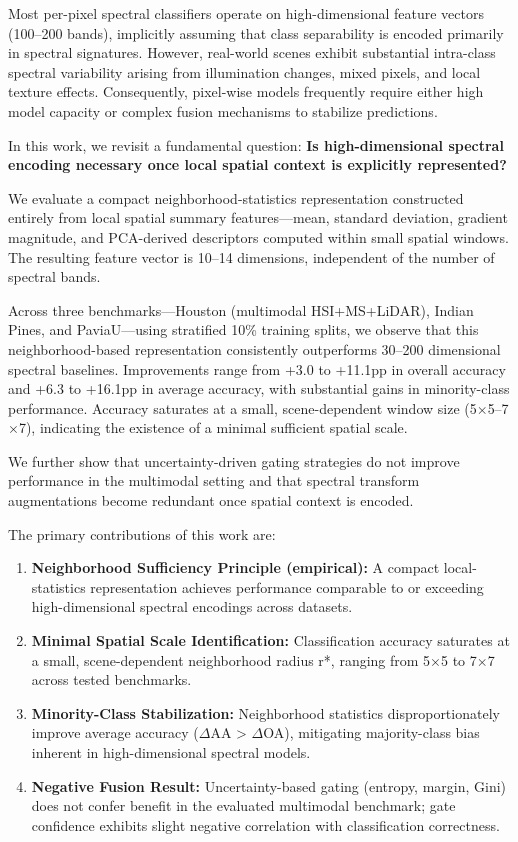 \documentclass[
  journal]{IEEEtran}
\providecommand{\tightlist}{%
  \setlength{\itemsep}{0pt}\setlength{\parskip}{0pt}}
\begin{document}
Most per-pixel spectral classifiers operate on high-dimensional feature
vectors (100--200 bands), implicitly assuming that class separability is
encoded primarily in spectral signatures. However, real-world scenes
exhibit substantial intra-class spectral variability arising from
illumination changes, mixed pixels, and local texture effects.
Consequently, pixel-wise models frequently require either high model
capacity or complex fusion mechanisms to stabilize predictions.

In this work, we revisit a fundamental question: \textbf{Is
high-dimensional spectral encoding necessary once local spatial context
is explicitly represented?}

We evaluate a compact neighborhood-statistics representation constructed
entirely from local spatial summary features---mean, standard deviation,
gradient magnitude, and PCA-derived descriptors computed within small
spatial windows. The resulting feature vector is 10--14 dimensions,
independent of the number of spectral bands.

Across three benchmarks---Houston (multimodal HSI+MS+LiDAR), Indian
Pines, and PaviaU---using stratified 10\% training splits, we observe
that this neighborhood-based representation consistently outperforms
30--200 dimensional spectral baselines. Improvements range from +3.0 to
+11.1pp in overall accuracy and +6.3 to +16.1pp in average accuracy,
with substantial gains in minority-class performance. Accuracy saturates
at a small, scene-dependent window size (5\(\times\)5--7\(\times\)7), indicating the
existence of a minimal sufficient spatial scale.

We further show that uncertainty-driven gating strategies do not improve
performance in the multimodal setting and that spectral transform
augmentations become redundant once spatial context is encoded.

The primary contributions of this work are:

\begin{enumerate}
\def\labelenumi{\arabic{enumi}.}
\tightlist
\item
  \textbf{Neighborhood Sufficiency Principle (empirical):} A compact
  local-statistics representation achieves performance comparable to or
  exceeding high-dimensional spectral encodings across datasets.
\item
  \textbf{Minimal Spatial Scale Identification:} Classification accuracy
  saturates at a small, scene-dependent neighborhood radius r*, ranging
  from 5\(\times\)5 to 7\(\times\)7 across tested benchmarks.
\item
  \textbf{Minority-Class Stabilization:} Neighborhood statistics
  disproportionately improve average accuracy (\(\Delta\)AA \textgreater{} \(\Delta\)OA),
  mitigating majority-class bias inherent in high-dimensional spectral
  models.
\item
  \textbf{Negative Fusion Result:} Uncertainty-based gating (entropy,
  margin, Gini) does not confer benefit in the evaluated multimodal
  benchmark; gate confidence exhibits slight negative correlation with
  classification correctness.
\end{enumerate}
\end{document}
